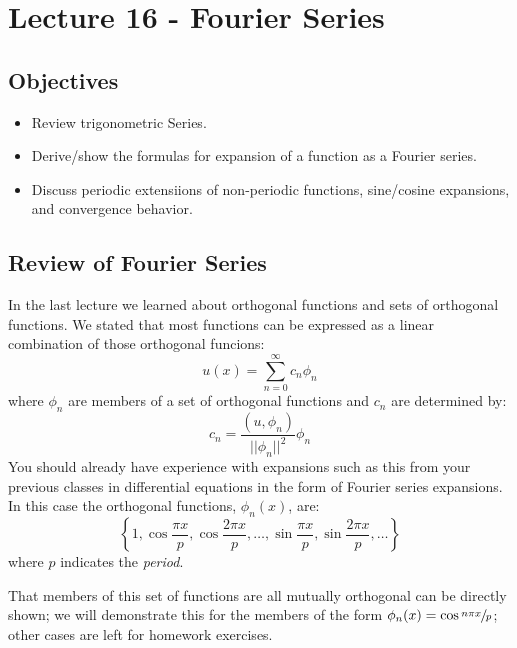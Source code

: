 \chapter{Lecture 16 - Fourier Series}
\label{ch:lec16}
\section{Objectives}
\begin{itemize}
\item Review trigonometric Series.
\item Derive/show the formulas for expansion of a function as a Fourier series.
\item Discuss periodic extensiions of non-periodic functions, sine/cosine expansions, and convergence behavior.
\end{itemize}

\section{Review of Fourier Series}
In the last lecture we learned about orthogonal functions and sets of orthogonal functions.  We stated that most functions can be expressed as a linear combination of those orthogonal funcions:
\begin{equation*}
u(x) = \sum\limits_{n=0}^{\infty} c_n \phi_n
\end{equation*}
where $\phi_n$ are members of a set of orthogonal functions and $c_n$ are determined by:
\begin{equation*}
c_n = \frac{(u,\phi_n)}{||\phi_n||^2}\phi_n
\end{equation*} 
You should already have experience with expansions such as this from your previous classes in differential equations in the form of Fourier series expansions.  In this case the orthogonal functions, $\phi_n(x)$, are:
\begin{equation*}
\left\{1,\cos{\frac{\pi x}{p}},\cos{\frac{2\pi x}{p}},\dots,\sin{\frac{\pi x}{p}}, \sin{\frac{2\pi x}{p}}, \dots \right\}
\end{equation*}
where $p$ indicates the \emph{period}.

That members of this set of functions are all mutually orthogonal can be directly shown; we will demonstrate this for the members of the form $\phi_n(x) = \cos{\sfrac{n \pi x}{p}}$; other cases are left for homework exercises.

